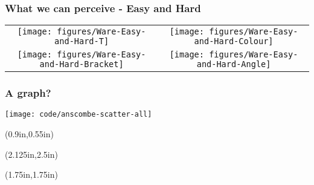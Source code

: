 \documentclass{beamer}
\newcommand{\key}[1]{\textcolor{keyred}{{\bf #1}}}
\begin{document}
\begin{frame}
\frametitle{What we can perceive - Easy and Hard}
\begin{tabular}{cc}
\texttt{[image: figures/Ware-Easy-and-Hard-T]}
&
\texttt{[image: figures/Ware-Easy-and-Hard-Colour]}
\\
\pause
\texttt{[image: figures/Ware-Easy-and-Hard-Bracket]}
&
\texttt{[image: figures/Ware-Easy-and-Hard-Angle]}
\end{tabular}
\end{frame}


%

\begin{frame}
\frametitle{A graph?}
\texttt{[image: code/anscombe-scatter-all]}
\begin{textblock*}{5in}(0.9in,0.55in)
\begin{minipage}{0.75\textwidth}
\end{minipage}
\end{textblock*}
\begin{textblock*}{3.5in}(2.125in,2.5in)
\begin{minipage}{0.75\textwidth}
\end{minipage}
\end{textblock*}
\begin{textblock*}{3.5in}(1.75in,1.75in)
\begin{minipage}{0.75\textwidth}
\visible<3->{\Huge \key{\faThumbsDown \faThumbsDown \faThumbsDown ~~~ \faThumbsDown \faThumbsDown \faThumbsDown}}
\end{minipage}
\end{textblock*}
\end{frame}
\end{document}
